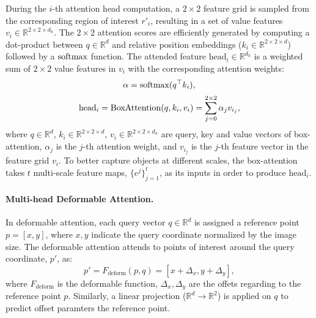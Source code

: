 During the $i$-th attention head computation, a $2 {\times} 2$ feature grid is sampled from the corresponding region of interest $r'_i$, resulting in a set of value features $v_i \in \mathbb{R}^{2 \times 2 \times d_h}$. The $2 {\times} 2$ attention scores are efficiently generated by computing a dot-product between $q \in \mathbb{R}^d$ and relative position embeddings ($k_i \in \mathbb{R}^{2 \times 2 \times d}$) followed by a $\mathrm{softmax}$ function. The attended feature $\mathrm{head}_i \in \mathbb{R}^{d_h}$ is a weighted sum of $2 {\times} 2$ value features in $v_i$ with the corresponding attention weights:
%
\begin{equation}
    \alpha =  \mathrm{softmax}(q^{\top} {k_i}),
\end{equation}
\begin{equation}
    \mathrm{head}_i = \mathop{\mathrm{BoxAttention}}(q, k_i, v_i) = \sum_{j=0}^{2 \times 2} \alpha_j v_{i_j},
\end{equation}
%
where $q \in \mathbb{R}^d$, $k_i \in \mathbb{R}^{2 \times 2 \times d}$, $v_i \in \mathbb{R}^{2 \times 2 \times d_h}$ are query, key and value vectors of box-attention, $\alpha_j$ is the $j$-th attention weight, and $v_{i_j}$ is the $j$-th feature vector in the feature grid $v_i$. To better capture objects at different scales, the box-attention~\cite{nguyen2022boxer} takes $t$ multi-scale feature maps, $\{e^j\}_{j=1}^t$, as its inputs in order to produce $\mathrm{head}_i$.

\paragraph{Multi-head Deformable Attention.} In deformable attention, each query vector $q \in \mathbb{R}^d$ is assigned a reference point $p=[x,y]$, where $x,y$ indicate the query coordinate normalized by the image size. The deformable attention attends to points of interest around the query coordinate, $p'$, as:
%
\begin{equation}
    p' = F_\text{deform}(p, q) = [x + \Delta_x, y + \Delta_y],
\end{equation}
%
where $F_\text{deform}$ is the deformable function, $\Delta_x,\Delta_y$ are the offets regarding to the reference point $p$. Similarly, a linear projection ($\mathbb{R}^d \rightarrow \mathbb{R}^2$) is applied on $q$ to predict offset paramters \wrt the reference point.

